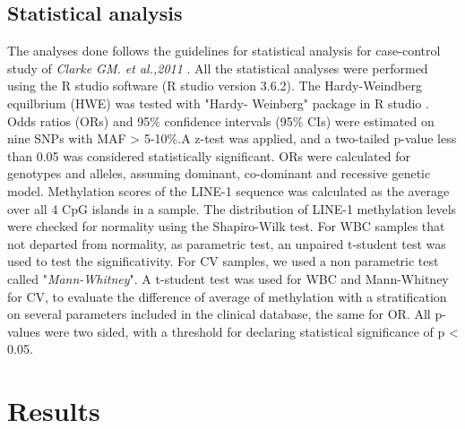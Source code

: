 \documentclass[10pt,letterpaper]{article}
\begin{document}
\subsection*{Statistical analysis}

\noindent The analyses done follows the guidelines for statistical analysis for case-control study of \textit{Clarke GM. et al.,2011} \cite{clarke2011basic}. All the statistical analyses were performed using the R studio software (R studio version 3.6.2). The Hardy-Weindberg equilbrium (HWE) was tested with "Hardy- Weinberg" package in R studio \cite{graffelman2015exploring}. Odds ratios (ORs) and 95\% confidence intervals (95\% CIs) were estimated on nine SNPs with MAF > 5-10\%.A z-test was applied, and a two-tailed p-value less than 0.05 was considered statistically significant. ORs were calculated for genotypes and alleles, assuming dominant, co-dominant and recessive genetic model. Methylation scores of the LINE-1 sequence was calculated as the average over all 4 CpG islands in a sample. The distribution of LINE-1 methylation levels were checked for normality using the Shapiro-Wilk test. For WBC samples that not departed from normality, as parametric test, an unpaired t-student test was used to test the significativity. For CV samples, we used a non parametric test called "\textit{Mann-Whitney}". A t-student test was used for WBC and Mann-Whitney for CV, to evaluate the difference of average of methylation with a stratification on several parameters included in the clinical database, the same for OR. All p-values were two sided, with a threshold for declaring statistical significance of p < 0.05. \\



\section*{Results}
\end{document}
